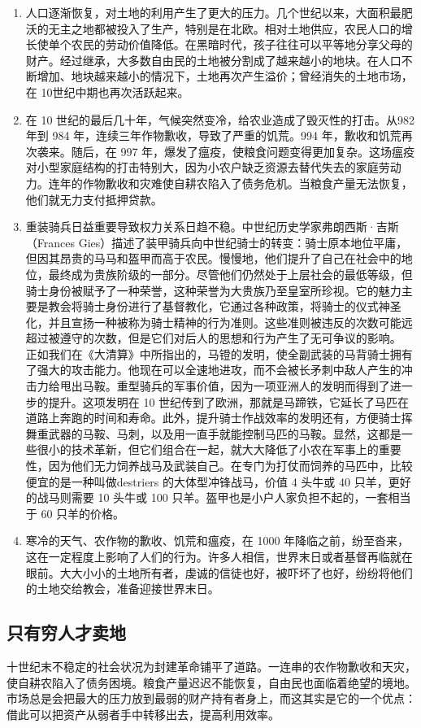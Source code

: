 \begin{enumerate}
    \item 人口逐渐恢复，对土地的利用产生了更大的压力。几个世纪以来，大面积最肥沃的无主之地都被投入了生产，特别是在北欧。相对土地供应，农民人口的增长使单个农民的劳动价值降低。在黑暗时代，孩子往往可以平等地分享父母的财产。经过继承，大多数自由民的土地被分割成了越来越小的地块。在人口不断增加、地块越来越小的情况下，土地再次产生溢价；曾经消失的土地市场，在 10世纪中期也再次活跃起来。
    \item 在 10 世纪的最后几十年，气候突然变冷，给农业造成了毁灭性的打击。从982 年到 984 年，连续三年作物歉收，导致了严重的饥荒。994 年，歉收和饥荒再次袭来。随后，在 997 年，爆发了瘟疫，使粮食问题变得更加复杂。这场瘟疫对小型家庭结构的打击特别大，因为小农户缺乏资源去替代失去的家庭劳动力。连年的作物歉收和灾难使自耕农陷入了债务危机。当粮食产量无法恢复，他们就无力支付抵押贷款。
    \item 重装骑兵日益重要导致权力关系日趋不稳。中世纪历史学家弗朗西斯·吉斯（Frances Gies）描述了装甲骑兵向中世纪骑士的转变：骑士原本地位平庸，但因其昂贵的马马和盔甲而高于农民。慢慢地，他们提升了自己在社会中的地位，最终成为贵族阶级的一部分。尽管他们仍然处于上层社会的最低等级，但骑士身份被赋予了一种荣誉，这种荣誉为大贵族乃至皇室所珍视。它的魅力主要是教会将骑士身份进行了基督教化，它通过各种政策，将骑士的仪式神圣化，并且宣扬一种被称为骑士精神的行为准则。这些准则被违反的次数可能远超过被遵守的次数，但是它们对后人的思想和行为产生了无可争议的影响。 正如我们在《大清算》中所指出的，马镫的发明，使全副武装的马背骑士拥有了强大的攻击能力。他现在可以全速地进攻，而不会被长矛刺中敌人产生的冲击力给甩出马鞍。重型骑兵的军事价值，因为一项亚洲人的发明而得到了进一步的提升。这项发明在 10 世纪传到了欧洲，那就是马蹄铁，它延长了马匹在道路上奔跑的时间和寿命。此外，提升骑士作战效率的发明还有，方便骑士挥舞重武器的马鞍、马刺，以及用一直手就能控制马匹的马鞍。显然，这都是一些很小的技术革新，但它们组合在一起，就大大降低了小农在军事上的重要性，因为他们无力饲养战马及武装自己。在专门为打仗而饲养的马匹中，比较便宜的是一种叫做destriers 的大体型冲锋战马，价值 4 头牛或 40 只羊，更好的战马则需要 10 头牛或 100 只羊。盔甲也是小户人家负担不起的，一套相当于 60 只羊的价格。
    \item 寒冷的天气、农作物的歉收、饥荒和瘟疫，在 1000 年降临之前，纷至沓来，这在一定程度上影响了人们的行为。许多人相信，世界末日或者基督再临就在眼前。大大小小的土地所有者，虔诚的信徒也好，被吓坏了也好，纷纷将他们的土地交给教会，准备迎接世界末日。
\end{enumerate}

\subsection{只有穷人才卖地}
十世纪末不稳定的社会状况为封建革命铺平了道路。一连串的农作物歉收和天灾，使自耕农陷入了债务困境。粮食产量迟迟不能恢复，自由民也面临着绝望的境地。市场总是会把最大的压力放到最弱的财产持有者身上，而这其实是它的一个优点：借此可以把资产从弱者手中转移出去，提高利用效率。

